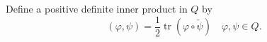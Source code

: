 Define a positive definite inner product in $Q$ by
$$
(\varphi, \psi) = \frac{1}{2} \operatorname{tr} (\varphi \circ \tilde{\psi}) \quad \varphi, \psi \in Q.
$$
